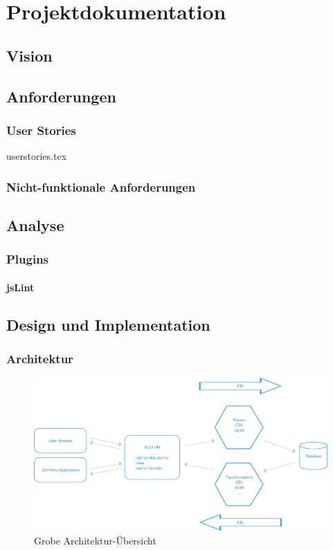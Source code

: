 \part{Projektdokumentation}

\chapter{Vision}

\chapter{Anforderungen}
\section{User Stories}
{userstories.tex}

\section{Nicht-funktionale Anforderungen}


\chapter{Analyse}
\section{Plugins}
\subsection{jsLint}

\chapter{Design und Implementation}


\section{Architektur}

\begin{figure}[H]
    \centering
    \includegraphics[width=\linewidth]{fig/ODH-Architecture-Overview}
    \caption{Grobe Architektur-Übersicht}
\end{figure}

